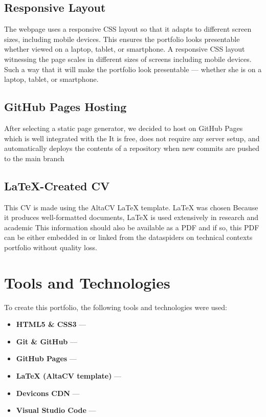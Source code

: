 \documentclass[12pt,a4paper]{article}
\begin{document}
\subsection{Responsive Layout}
The webpage uses a responsive CSS layout so that it adapts to different screen sizes,
including mobile devices. This ensures the portfolio looks presentable whether viewed
on a laptop, tablet, or smartphone.
A responsive CSS layout witnessing the page scales in different sizes of screens including mobile devices. Such a way that it will make the portfolio look presentable — whether she is on a laptop, tablet, or smartphone.

\subsection{GitHub Pages Hosting}
After selecting a static page generator, we decided to host on GitHub Pages which is well integrated with the It is free, does not require any server setup, and automatically deploys the contents of a repository when new commits are pushed to the main branch

\subsection{LaTeX-Created CV}
This CV is made using the AltaCV LaTeX template. LaTeX was chosen Because it produces well-formatted documents, LaTeX is used extensively in research and academic This information should also be available as a PDF and if so, this PDF can be either embedded in or linked from the dataspiders on technical contexts portfolio without quality loss.

\section{Tools and Technologies}

To create this portfolio, the following tools and technologies were used:

\begin{itemize}
    \item \textbf{HTML5 \& CSS3} ---
    \item \textbf{Git \& GitHub} ---
    \item \textbf{GitHub Pages} ---
    \item \textbf{LaTeX (AltaCV template)} ---
    \item \textbf{Devicons CDN} ---
    \item \textbf{Visual Studio Code} ---
\end{itemize}
\end{document}
